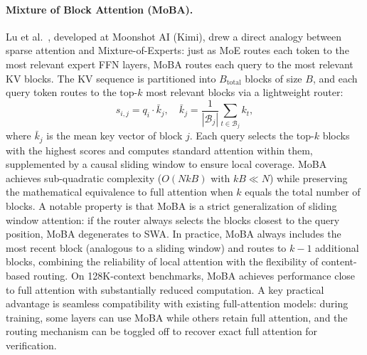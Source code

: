 \paragraph{Mixture of Block Attention (MoBA).}
Lu et al.~\cite{lu2025moba}, developed at Moonshot AI (Kimi), drew a direct analogy between sparse attention and Mixture-of-Experts: just as MoE routes each token to the most relevant expert FFN layers, MoBA routes each query to the most relevant KV blocks. The KV sequence is partitioned into $B_{\text{total}}$ blocks of size $B$, and each query token routes to the top-$k$ most relevant blocks via a lightweight router:
\begin{equation}
s_{i,j} = q_i \cdot \bar{k}_j, \quad \bar{k}_j = \frac{1}{|\mathcal{B}_j|}\sum_{t \in \mathcal{B}_j} k_t,
\label{eq:moba-router}
\end{equation}
where $\bar{k}_j$ is the mean key vector of block $j$. Each query selects the top-$k$ blocks with the highest scores and computes standard attention within them, supplemented by a causal sliding window to ensure local coverage. MoBA achieves sub-quadratic complexity ($O(NkB)$ with $kB \ll N$) while preserving the mathematical equivalence to full attention when $k$ equals the total number of blocks. A notable property is that MoBA is a strict generalization of sliding window attention: if the router always selects the blocks closest to the query position, MoBA degenerates to SWA. In practice, MoBA always includes the most recent block (analogous to a sliding window) and routes to $k - 1$ additional blocks, combining the reliability of local attention with the flexibility of content-based routing. On 128K-context benchmarks, MoBA achieves performance close to full attention with substantially reduced computation. A key practical advantage is seamless compatibility with existing full-attention models: during training, some layers can use MoBA while others retain full attention, and the routing mechanism can be toggled off to recover exact full attention for verification.

